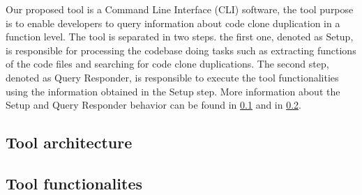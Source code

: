 \en

Our proposed tool is a Command Line Interface (CLI) software, the tool purpose is to enable developers to query 
information about code clone duplication in a function level. The tool is separated in two steps. the 
first one, denoted as Setup, is responsible for processing the codebase doing tasks such as extracting functions of the code files 
and searching for code clone duplications. The second step, denoted as Query Responder, is
responsible to execute the tool functionalities using the information obtained in the Setup step. More information about the 
Setup and Query Responder behavior can be found in \ref{subsec:architecture} and in \ref{subsec:func}.

\subsection{Tool architecture}
\label{subsec:architecture}


\subsection{Tool functionalites}
\label{subsec:func}
